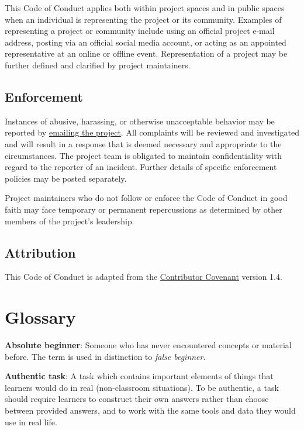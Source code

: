 This Code of Conduct applies both within project spaces and in public
spaces when an individual is representing the project or its
community. Examples of representing a project or community include
using an official project e-mail address, posting via an official
social media account, or acting as an appointed representative at an
online or offline event. Representation of a project may be further
defined and clarified by project maintainers.

\section{Enforcement}\label{enforcement}

Instances of abusive, harassing, or otherwise unacceptable behavior
may be reported by \href{mailto:gvwilson@third-bit.com}{emailing the project}. All
complaints will be reviewed and investigated and will result in a
response that is deemed necessary and appropriate to the
circumstances. The project team is obligated to maintain
confidentiality with regard to the reporter of an incident. Further
details of specific enforcement policies may be posted separately.

Project maintainers who do not follow or enforce the Code of Conduct
in good faith may face temporary or permanent repercussions as
determined by other members of the project's leadership.

\section{Attribution}\label{attribution}

This Code of Conduct is adapted from
the \href{https://www.contributor-covenant.org}{Contributor Covenant} version 1.4.

\chapter{Glossary}\label{s:gloss}

\textbf{\hypertarget{g:absolute-beginner}{Absolute beginner}\label{g:absolute-beginner}}: Someone who has
never encountered concepts or material before. The term is used in
distinction to \emph{false beginner}.

\textbf{\hypertarget{g:authentic-task}{Authentic task}\label{g:authentic-task}}: A task which contains
important elements of things that learners would do in real
(non-classroom situations). To be authentic, a task should require
learners to construct their own answers rather than choose between
provided answers, and to work with the same tools and data they would
use in real life.

